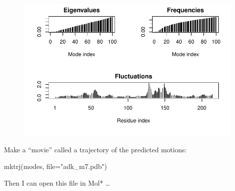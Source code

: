 \documentclass[
  letterpaper,
  DIV=11,
  numbers=noendperiod]{scrartcl}
\newenvironment{Shaded}{\begin{snugshade}}{\end{snugshade}}
\newcommand{\AttributeTok}[1]{\textcolor[rgb]{0.40,0.45,0.13}{#1}}
\newcommand{\FunctionTok}[1]{\textcolor[rgb]{0.28,0.35,0.67}{#1}}
\newcommand{\NormalTok}[1]{\textcolor[rgb]{0.00,0.23,0.31}{#1}}
\newcommand{\StringTok}[1]{\textcolor[rgb]{0.13,0.47,0.30}{#1}}
\begin{document}
\begin{figure}[H]

{\centering \includegraphics{class10_files/figure-pdf/unnamed-chunk-13-1.pdf}

}

\end{figure}

Make a ``movie'' called a trajectory of the predicted motions:

\begin{Shaded}
\begin{Highlighting}[]
\FunctionTok{mktrj}\NormalTok{(modes, }\AttributeTok{file=}\StringTok{"adk\_m7.pdb"}\NormalTok{)}
\end{Highlighting}
\end{Shaded}

Then I can open this file in Mol* \ldots{}
\end{document}
